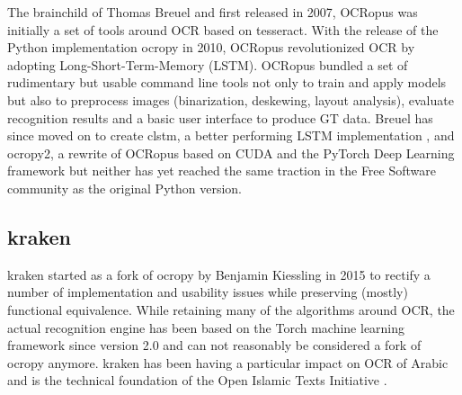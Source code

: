 \documentclass[conference]{IEEEtran}
\begin{document}
The brainchild of Thomas Breuel and first released in 2007, OCRopus
\cite{breuel} was initially a set of tools around OCR based on
tesseract. With the release of the Python implementation ocropy in
2010, OCRopus revolutionized OCR by adopting
Long-Short-Term-Memory (LSTM). OCRopus bundled a set of rudimentary but
usable command line tools not only to train and apply models but
also to preprocess images (binarization, deskewing, layout analysis),
evaluate recognition results and a basic user interface to produce
GT data. Breuel has since moved on to create clstm, a better
performing LSTM implementation \cite{DBLP:conf/icdar/Breuel17}, and
ocropy2, a rewrite of OCRopus based on CUDA and the PyTorch Deep
Learning framework \cite{DBLP:conf/icdar/Breuel17} but neither has
yet reached the same traction in the Free Software community as the
original Python version.





\subsection{kraken}

kraken \cite{DBLP:journals/corr/RomanovMSK17} started as a fork of ocropy
by Benjamin Kiessling in 2015 to rectify a number of implementation and usability
issues while preserving (mostly) functional equivalence. While retaining many of
the algorithms around OCR, the actual recognition engine has been based on the
Torch machine learning framework since version 2.0 and can not reasonably be
considered a fork of ocropy anymore. kraken has been having a particular impact
on OCR of Arabic and is the technical foundation of the Open Islamic Texts
Initiative \cite{miller_romanov_savant_2018}.

\end{document}
